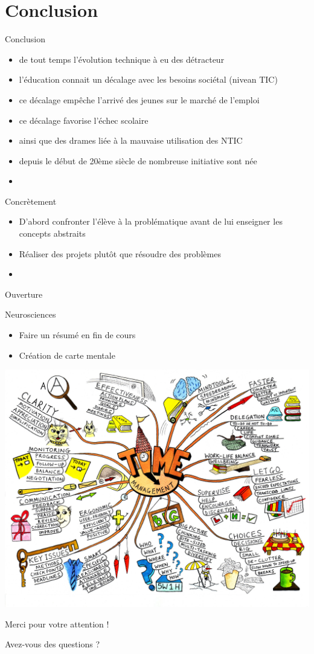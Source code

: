 \section{Conclusion}

\begin{frame}{Conclusion}
  \begin{itemize}
    \item de tout temps l'évolution technique à eu des détracteur
    \item l'éducation connait un décalage avec les besoins sociétal (nivean TIC)
    \item ce décalage empêche l'arrivé des jeunes sur le marché de l'emploi
    \item ce décalage favorise l'échec scolaire
    \item ainsi que des drames liée à la mauvaise utilisation des NTIC
    \item depuis le début de 20ème siècle de nombreuse initiative sont née
    \item 
  \end{itemize}
\end{frame}

\begin{frame}{Concrètement}
\begin{itemize}
  \item D'abord confronter l'élève à la problématique avant de lui enseigner les concepts abstraits
  \item Réaliser des projets plutôt que résoudre des problèmes
  \item 
\end{itemize}
\end{frame}

\begin{frame}{Ouverture}
  \vfill
    \begin{block}{Neurosciences}
    \begin{itemize}
    \item Faire un résumé en fin de cours
    \item Création de carte mentale
    \end{itemize}
  \end{block}
  \vfill
  \begin{center}
    \includegraphics[width=.6\textwidth]{../resources/illustrations/mindmap.jpg}
  \end{center}
    \vfill
\end{frame}

\begin{frame}
\Huge
\begin{center}
	Merci pour votre attention !
	
	Avez-vous des questions ?
\end{center}
\end{frame}

